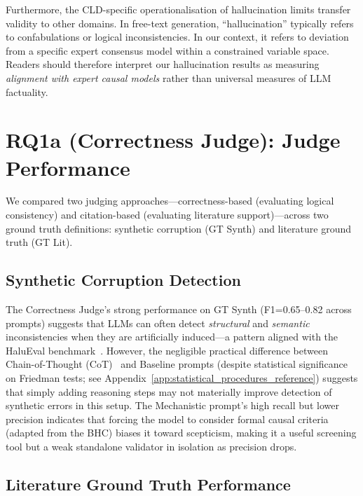 Furthermore, the CLD-specific operationalisation of hallucination limits transfer validity to other domains. In free-text generation, ``hallucination'' typically refers to confabulations or logical inconsistencies. In our context, it refers to deviation from a specific expert consensus model within a constrained variable space. Readers should therefore interpret our hallucination results as measuring \textit{alignment with expert causal models} rather than universal measures of LLM factuality.

\section{RQ1a (Correctness Judge): Judge Performance}
\label{sec:discussion_rq1a_correctness}

We compared two judging approaches---correctness-based (evaluating logical consistency) and citation-based (evaluating literature support)---across two ground truth definitions: synthetic corruption (GT Synth) and literature ground truth (GT Lit).

\subsection{Synthetic Corruption Detection}

The Correctness Judge's strong performance on GT Synth (F1=0.65--0.82 across prompts) suggests that LLMs can often detect \textit{structural} and \textit{semantic} inconsistencies when they are artificially induced---a pattern aligned with the HaluEval benchmark~\citep{li2023halueval}. However, the negligible practical difference between Chain-of-Thought (CoT)~\citep{kojima2022large} and Baseline prompts (despite statistical significance on Friedman tests; see Appendix~\ref{app:statistical_procedures_reference}) suggests that simply adding reasoning steps may not materially improve detection of synthetic errors in this setup. The Mechanistic prompt's high recall but lower precision indicates that forcing the model to consider formal causal criteria (adapted from the BHC) biases it toward scepticism, making it a useful screening tool but a weak standalone validator in isolation as precision drops.

\subsection{Literature Ground Truth Performance}


